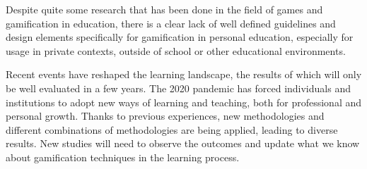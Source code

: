 Despite quite some research that has been done in the field of games and gamification in education, there is a clear lack of well defined guidelines and design elements specifically for gamification in personal education, especially for usage in private contexts, outside of school or other educational environments. 

Recent events have reshaped the learning landscape, the results of which will only be well evaluated in a few years. The 2020 pandemic has forced individuals and institutions to adopt new ways of learning and teaching, both for professional and personal growth. Thanks to previous experiences, new methodologies and different combinations of methodologies are being applied, leading to diverse results. New studies will need to observe the outcomes and update what we know about gamification techniques in the learning process.